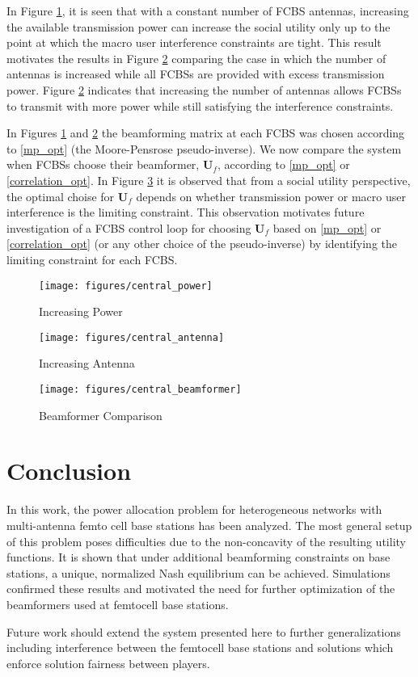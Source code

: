 In Figure \ref{central_power}, it is seen that with a constant number of FCBS antennas, increasing the available transmission power can increase the social utility only up to the point at which the macro user interference constraints are tight. This result motivates the results in Figure \ref{central_antenna} comparing the case in which the number of antennas is increased while all FCBSs are provided with excess transmission power. Figure \ref{central_antenna} indicates that increasing the number of antennas allows FCBSs to transmit with more power while still satisfying the interference constraints. 
\par
In Figures \ref{central_power} and \ref{central_antenna} the beamforming matrix at each FCBS was chosen according to \ref{mp_opt} (the Moore-Pensrose pseudo-inverse). We now compare the system when FCBSs choose their beamformer, $\mathbf{U}_f$, according to  \eqref{mp_opt} or \eqref{correlation_opt}. In Figure \ref{central_beamformer} it is observed that from a social utility perspective, the optimal choise for $\mathbf{U}_f$ depends on whether transmission power or macro user interference is the limiting constraint. This observation motivates future investigation of a FCBS control loop for choosing $\mathbf{U}_f$ based on \eqref{mp_opt} or \eqref{correlation_opt} (or any other choice of the pseudo-inverse) by identifying the limiting constraint for each FCBS. 

\begin{figure}[H]
	\texttt{[image: figures/central\_power]}
	  \caption{Increasing Power}
	  \label{central_power}
\end{figure}

\begin{figure}[H]
	\texttt{[image: figures/central\_antenna]}
	  \caption{Increasing Antenna}
	  \label{central_antenna}
\end{figure}
\begin{figure}[H]
	\texttt{[image: figures/central\_beamformer]}
	  \caption{Beamformer Comparison}
	  \label{central_beamformer}
\end{figure}


\chapter{Conclusion}
In this work, the power allocation problem for heterogeneous networks with multi-antenna femto cell base stations has been analyzed. The most general setup of this problem poses difficulties  due to the non-concavity of the resulting utility functions. It is shown that under additional beamforming constraints on base stations, a unique, normalized Nash equilibrium can be achieved. Simulations confirmed these results and motivated the need for further optimization of the beamformers used at femtocell base stations.
\par
Future work should extend the system presented here to further generalizations including interference between the femtocell base stations and solutions which enforce solution fairness between players. 